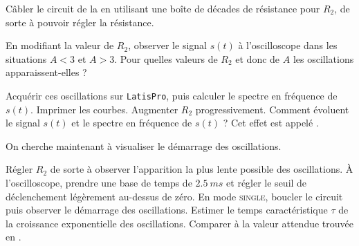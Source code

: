  Câbler le circuit de la  en utilisant une boîte de décades de résistance pour $R_2$, de sorte à pouvoir régler la résistance. 
\begin{protocole}
\item En modifiant la valeur de $R_2$, observer le signal $s(t)$ à l’oscilloscope dans les situations $A<3$ et $A>3$. Pour quelles valeurs de $R_2$ et donc de $A$ les oscillations apparaissent-elles ?
\item Acquérir ces oscillations sur \texttt{LatisPro}, puis calculer le spectre en fréquence de $s(t)$. Imprimer les courbes. Augmenter $R_2$ progressivement. Comment évoluent le signal $s(t)$ et le spectre en fréquence de $s(t)$ ? Cet effet est appelé .
\end{protocole}
On cherche maintenant à visualiser le démarrage des oscillations.
\begin{protocole}
\item Régler $R_2$ de sorte à observer l’apparition la plus lente possible des oscillations. À l'oscilloscope, prendre une base de temps de $\SI{2.5}{ms}$ et régler le seuil de déclenchement légèrement au-dessus de zéro. En mode \textsc{single}, boucler le circuit puis observer le démarrage des oscillations. Estimer le temps caractéristique $\tau$ de la croissance exponentielle des oscillations. Comparer à la valeur attendue trouvée en .


\end{protocole}

